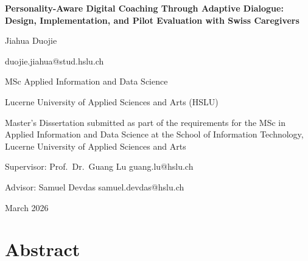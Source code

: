 \documentclass[10pt,a4paper]{report}
\begin{document}
\begin{titlepage}
\centering
\vspace*{2cm}
{\LARGE\bfseries Personality-Aware Digital Coaching Through Adaptive Dialogue: Design, Implementation, and Pilot Evaluation with Swiss Caregivers\par}
\vspace{2cm}
{\Large Jiahua Duojie\par}
\vspace{0.5cm}
{\normalsize duojie.jiahua@stud.hslu.ch\par}
\vspace{1.5cm}
{\large MSc Applied Information and Data Science\par}
{\large Lucerne University of Applied Sciences and Arts (HSLU)\par}
\vspace{0.5cm}
{\normalsize Master's Dissertation submitted as part of the requirements for the MSc in Applied Information and Data Science at the School of Information Technology, Lucerne University of Applied Sciences and Arts\par}
\vspace{1.5cm}
{\normalsize Supervisor: Prof.\ Dr.\ Guang Lu \quad guang.lu@hslu.ch\par}
{\normalsize Advisor: Samuel Devdas \quad samuel.devdas@hslu.ch\par}
\vfill
{\large March 2026\par}
\end{titlepage}

\chapter*{Abstract}
\end{document}
